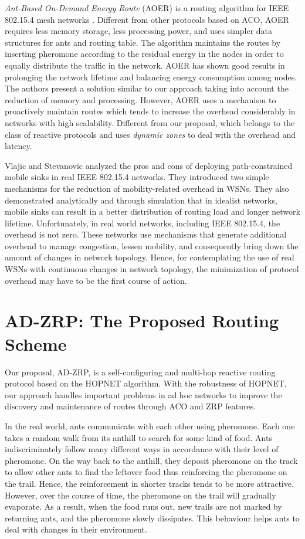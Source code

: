 \documentclass[conference]{IEEEtran}
\begin{document}
\emph{Ant-Based On-Demand Energy Route} (AOER) is  a routing algorithm for IEEE 802.15.4 mesh networks \cite{Shuang:2009}.
Different from other protocols based on ACO, AOER requires less memory storage, less processing power, and uses simpler data structures for ants and routing table.
The algorithm maintains the routes by inserting pheromone according to the residual energy in the nodes in order to equally distribute the traffic in the network.
AOER has shown good results in prolonging the network lifetime and balancing energy consumption among nodes.
The authors present a solution similar to our approach taking into account the reduction of memory and processing.
However, AOER uses a mechanism to proactively maintain routes which tends to increase the overhead considerably in networks with high scalability.
Different from our proposal, which belongs to the class of reactive protocols and uses \emph{dynamic zones} to deal with the overhead and latency.

Vlajic and Stevanovic \cite{Vlajic:2009} analyzed the pros and cons of deploying path-constrained mobile sinks in real IEEE 802.15.4 networks.
They introduced two simple mechanisms for the reduction of mobility-related overhead in WSNs.
They also demonstrated analytically and through simulation that in idealist networks, mobile sinks can result in a better distribution of routing load and longer network lifetime.
Unfortunately, in real world networks, including IEEE 802.15.4, the overhead is not zero.
These networks use mechanisms that generate additional overhead to manage congestion, lessen mobility, and consequently bring down the amount of changes in network topology.
Hence, for contemplating the use of real WSNs with continuous changes in network topology, the minimization of protocol overhead may have to be the first course of action.

\section{AD-ZRP: The Proposed Routing Scheme}
\label{proposed_scheme}

Our proposal, AD-ZRP, is a self-configuring and multi-hop reactive routing protocol based on the HOPNET algorithm.
With the robustness of HOPNET, our approach handles important problems in ad hoc networks to improve the discovery and maintenance of routes through ACO and ZRP features.

In the real world, ants communicate with each other using pheromone.
Each one takes a random walk from its anthill to search for some kind of food.
Ants indiscriminately follow many different ways in accordance with their level of pheromone.
On the way back to the anthill, they deposit pheromone on the track to allow other ants to find the leftover food thus reinforcing the pheromone on the trail.
Hence, the reinforcement in shorter tracks tends to be more attractive.
However, over the course of time, the pheromone on the trail will gradually evaporate.
As a result, when the food runs out, new trails are not marked by returning ants, and the pheromone slowly dissipates.
This behaviour helps ants to deal with changes in their environment.
\end{document}
